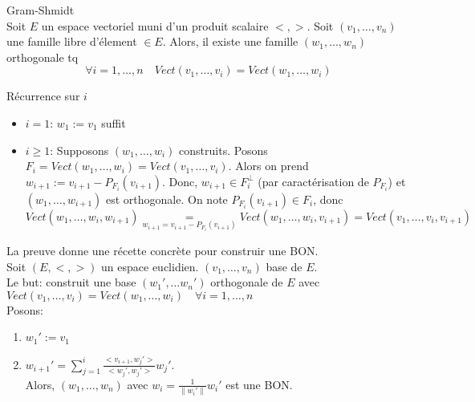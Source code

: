 \begin{theorem}Gram-Shmidt\\
    Soit $E$ un espace vectoriel muni d'un produit scalaire  $<,>$. Soit  $(v_1, \ldots, v_n)$ une famille libre d'élement $\in E$. Alors,  il existe une famille $(w_1, \ldots, w_n)$ orthogonale tq 
    \[
        \forall i = 1, \ldots, n \quad Vect(v_1, \ldots, v_i) = Vect(w_1, \ldots, w_i)
    \] 
\end{theorem}
\begin{preuve}
   Récurrence sur $i$\\ 
   \begin{itemize}
       \item $i = 1$:  $w_1 := v_1$ suffit
       \item $i \ge 1$: Supposons $(w_1, \ldots, w_i)$ construits. 
           Posons $F_i = Vect(w_1, \ldots, w_i) = Vect(v_1, \ldots, v_i)$. 
           Alors on prend $w_{i+1} := v_{i+1} - P_{F_i}(v_{i+1})$. 
           Donc,  $w_{i+1} \in F_i^{\perp}$ (par caractérisation de $P_{F_i}$) et $(w_1, \ldots, w_{i+1})$ est orthogonale. On note $P_{F_i}(v_{i+1}) \in F_i$, donc
            \[
                Vect(w_1, \ldots, w_i, w_{i+1}) \underset{w_{i+1} = v_{i+1} - P_{F_i}(v_{i+1})} = Vect(w_1, \ldots, w_i, v_{i+1}) = Vect(v_1, \ldots, v_i, v_{i+1})
           \] 
   \end{itemize}
\end{preuve}
\begin{remark}
   La preuve donne une récette concrète pour construir une BON.\\ 
   Soit $(E, <,>)$ un espace euclidien.  $(v_1, \ldots, v_n)$ base de $E$.\\
   Le but: construit une base  $(w_1', \ldots w_n')$ orthogonale de $E$ avec  $Vect(v_1, \ldots, v_i) = Vect(w_1, \ldots, w_i) \quad \forall i = 1, \ldots, n$\\
   Posons:
   \begin{enumerate}
       \item $w_1' := v_1$
       \item $w_{i+1}' = \sum_{j=1}^{i} \frac{<v_{i+1}, w_j'>}{<w_j', w_j'>}w_j'$. \\
           Alors, $(w_1, \ldots, w_n)$ avec $w_i = \frac{1}{\|w_i'\|}w_i'$ est une BON.
   \end{enumerate}
\end{remark}

